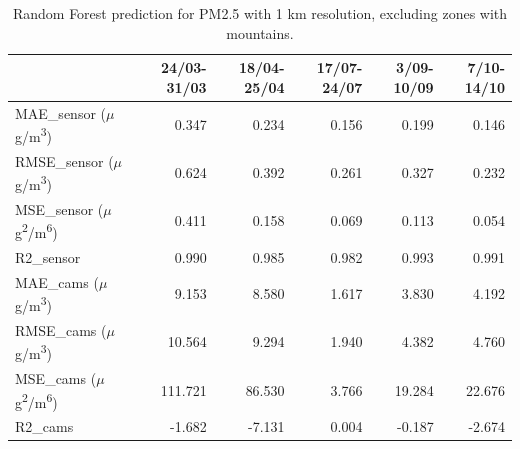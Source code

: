 \begin{table}[H]
\begin{tabular}{lrrrrr}
\toprule
 &  24/03-31/03 &  18/04-25/04 &  17/07-24/07 &  3/09-10/09 &  7/10-14/10 \\
\midrule
 MAE\_sensor ($\mu$g/m\textsuperscript{3})&        0.347 &        0.234 &        0.156 &       0.199 &       0.146 \\
RMSE\_sensor ($\mu$g/m\textsuperscript{3})&        0.624 &        0.392 &        0.261 &       0.327 &       0.232 \\
 MSE\_sensor ($\mu$g\textsuperscript{2}/m\textsuperscript{6})&        0.411 &        0.158 &        0.069 &       0.113 &       0.054 \\
  R2\_sensor &        0.990 &        0.985 &        0.982 &       0.993 &       0.991 \\
   MAE\_cams ($\mu$g/m\textsuperscript{3})&        9.153 &        8.580 &        1.617 &       3.830 &       4.192 \\
  RMSE\_cams ($\mu$g/m\textsuperscript{3})&       10.564 &        9.294 &        1.940 &       4.382 &       4.760 \\
   MSE\_cams ($\mu$g\textsuperscript{2}/m\textsuperscript{6})&      111.721 &       86.530 &        3.766 &      19.284 &      22.676 \\
    R2\_cams &       -1.682 &       -7.131 &        0.004 &      -0.187 &      -2.674 \\
\bottomrule
\end{tabular}
\caption{Random Forest prediction for PM2.5 with 1 km resolution, excluding zones with mountains.}
\end{table}
